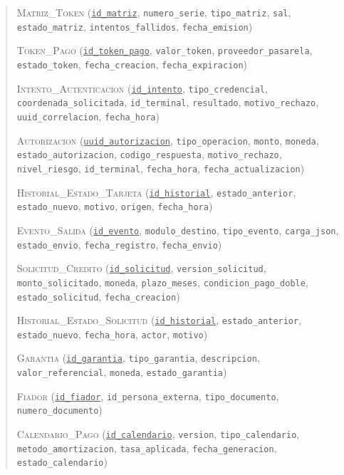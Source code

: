 \begin{quote}
\textsc{Matriz\_Token} (\underline{\texttt{id\_matriz}}, \texttt{numero\_serie}, \texttt{tipo\_matriz}, \texttt{sal}, \texttt{estado\_matriz}, \texttt{intentos\_fallidos}, \texttt{fecha\_emision})

\textsc{Token\_Pago} (\underline{\texttt{id\_token\_pago}}, \texttt{valor\_token}, \texttt{proveedor\_pasarela}, \texttt{estado\_token}, \texttt{fecha\_creacion}, \texttt{fecha\_expiracion})

\textsc{Intento\_Autenticacion} (\underline{\texttt{id\_intento}}, \texttt{tipo\_credencial}, \texttt{coordenada\_solicitada}, \texttt{id\_terminal}, \texttt{resultado}, \texttt{motivo\_rechazo}, \texttt{uuid\_correlacion}, \texttt{fecha\_hora})

\textsc{Autorizacion} (\underline{\texttt{uuid\_autorizacion}}, \texttt{tipo\_operacion}, \texttt{monto}, \texttt{moneda}, \texttt{estado\_autorizacion}, \texttt{codigo\_respuesta}, \texttt{motivo\_rechazo}, \texttt{nivel\_riesgo}, \texttt{id\_terminal}, \texttt{fecha\_hora}, \texttt{fecha\_actualizacion})

\textsc{Historial\_Estado\_Tarjeta} (\underline{\texttt{id\_historial}}, \texttt{estado\_anterior}, \texttt{estado\_nuevo}, \texttt{motivo}, \texttt{origen}, \texttt{fecha\_hora})

\textsc{Evento\_Salida} (\underline{\texttt{id\_evento}}, \texttt{modulo\_destino}, \texttt{tipo\_evento}, \texttt{carga\_json}, \texttt{estado\_envio}, \texttt{fecha\_registro}, \texttt{fecha\_envio})

\textsc{Solicitud\_Credito} (\underline{\texttt{id\_solicitud}}, \texttt{version\_solicitud}, \texttt{monto\_solicitado}, \texttt{moneda}, \texttt{plazo\_meses}, \texttt{condicion\_pago\_doble}, \texttt{estado\_solicitud}, \texttt{fecha\_creacion})

\textsc{Historial\_Estado\_Solicitud} (\underline{\texttt{id\_historial}}, \texttt{estado\_anterior}, \texttt{estado\_nuevo}, \texttt{fecha\_hora}, \texttt{actor}, \texttt{motivo})

\textsc{Garantia} (\underline{\texttt{id\_garantia}}, \texttt{tipo\_garantia}, \texttt{descripcion}, \texttt{valor\_referencial}, \texttt{moneda}, \texttt{estado\_garantia})

\textsc{Fiador} (\underline{\texttt{id\_fiador}}, \texttt{id\_persona\_externa}, \texttt{tipo\_documento}, \texttt{numero\_documento})

\textsc{Calendario\_Pago} (\underline{\texttt{id\_calendario}}, \texttt{version}, \texttt{tipo\_calendario}, \texttt{metodo\_amortizacion}, \texttt{tasa\_aplicada}, \texttt{fecha\_generacion}, \texttt{estado\_calendario})


\end{quote}
